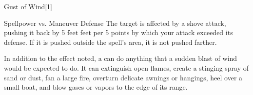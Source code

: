 \begin{spellsection}{Gust of Wind}[1]
    \begin{spellheader}
    \end{spellheader}
    \begin{spellcontent}
        \begin{spelltargetinginfo}
        \end{spelltargetinginfo}
        \begin{spelleffects}
            \begin{spellattack}{Spellpower vs. Maneuver Defense}
                \spellsuccess The target is affected by a shove attack, pushing it back by 5 feet  feet per 5 points by which your attack exceeded its defense. If it is pushed outside the spell's area, it is not pushed farther.
            \end{spellattack}
        \end{spelleffects}
    \end{spellcontent}
    \begin{spellfooter}
        \spellnotes In addition to the effect noted, a  can do anything that a sudden blast of wind would be expected to do. It can extinguish open flames, create a stinging spray of sand or dust, fan a large fire, overturn delicate awnings or hangings, heel over a small boat, and blow gases or vapors to the edge of its range.
        \miscastexplode
    \end{spellfooter}
    \begin{spellaugments}
    \end{spellaugments}
\end{spellsection}


